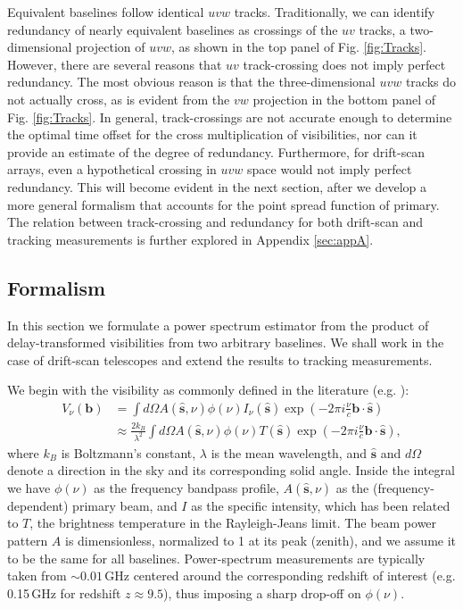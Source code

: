 \documentclass[twocolumn,apj,numberedappendix]{emulateapj}
\renewcommand\[{\begin{equation}}
\renewcommand\]{\end{equation}}
\begin{document}
Equivalent baselines follow identical $uvw$ tracks. Traditionally, we can identify
redundancy of nearly equivalent baselines as crossings
of the $uv$ tracks, a two-dimensional projection of $uvw$, as shown in the top panel of Fig. \ref{fig:Tracks}. However, there are several reasons that $uv$ track-crossing does not imply perfect redundancy. The most obvious reason is that the three-dimensional $uvw$ tracks do not actually cross, as is evident from the $vw$ projection in the bottom panel of Fig. \ref{fig:Tracks}. In general, track-crossings are
not accurate enough to determine the optimal time offset for the cross multiplication of visibilities, nor can it provide an estimate of the degree of redundancy.   Furthermore, for drift-scan arrays, even a hypothetical crossing in $uvw$ space would not imply perfect redundancy. This will become evident in the next section, after we develop a more general formalism that accounts for the point spread function of primary. The relation between track-crossing and redundancy for both drift-scan and tracking measurements is further explored in Appendix \ref{sec:appA}. 



\subsection{Formalism \label{sec:formalism}}
\label{sec:formalism}
In this section we formulate a power spectrum estimator from
the product of delay-transformed visibilities from two arbitrary baselines. We shall work in the case of drift-scan telescopes and extend the results to tracking measurements. 

We begin with the visibility as commonly defined in the literature (e.g.
\citealt{TMS, first-paper}): 
\begin{equation}
\begin{aligned}V_{\nu}(\boldsymbol{b}) & =\int d\Omega A(\hat{\boldsymbol{s}},\nu)\phi(\nu)I_{\nu}(\hat{\boldsymbol{s}})\exp\left(-2\pi i\frac{\nu}{c}\boldsymbol{b}\cdot\hat{\boldsymbol{s}}\right)\\
 & \approx\frac{2k_{B}}{\lambda^{2}}\int d\Omega A(\hat{\boldsymbol{s}},\nu)\phi(\nu)T(\hat{\boldsymbol{s}})\exp\left(-2\pi i\frac{\nu}{c}\boldsymbol{b}\cdot\hat{\boldsymbol{s}}\right),
\end{aligned}
\label{eq:Vis1}
\end{equation}
where $k_B$ is Boltzmann's constant, $\lambda$ is the mean wavelength, and $\hat{\boldsymbol{s}}$ and $d \Omega$ denote a direction in the
sky and its corresponding solid angle. Inside the integral we have $\phi(\nu)$ as the frequency bandpass profile, $A(\hat{\boldsymbol{s}},\nu)$ as the (frequency-dependent) primary beam, and $I$ as the specific intensity, which has been
related to $T$, the brightness temperature in the Rayleigh-Jeans
limit. The beam power pattern $A$ is dimensionless,
normalized to 1 at its peak (zenith), and we assume it to be the same
for all baselines. Power-spectrum measurements are typically taken from $\sim0.01$\,GHz centered around the corresponding redshift of interest (e.g. 0.15\,GHz for redshift $z\approx9.5$), thus imposing a sharp drop-off on $\phi(\nu)$. 
\end{document}
